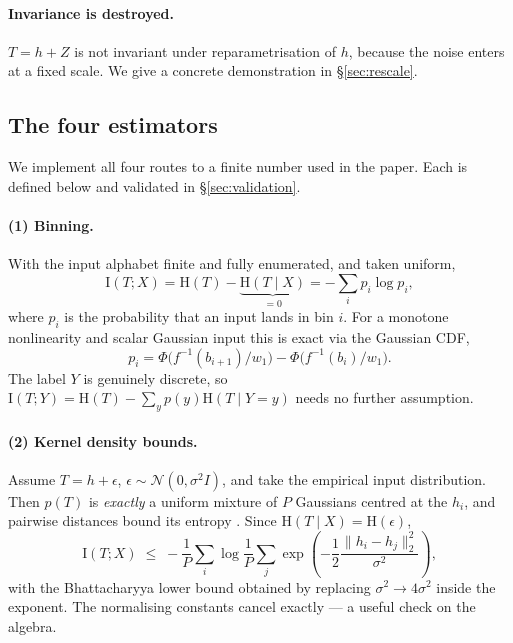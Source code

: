 \documentclass[11pt,a4paper]{article}
\newcommand{\I}{\mathrm{I}}
\newcommand{\HH}{\mathrm{H}}
\newcommand{\Norm}{\mathcal{N}}
\begin{document}
\paragraph{Invariance is destroyed.} $T = h+Z$ is not invariant under
reparametrisation of $h$, because the noise enters at a fixed scale. We give a
concrete demonstration in \S\ref{sec:rescale}.

\subsection{The four estimators}
\label{sec:estimators}

We implement all four routes to a finite number used in the paper. Each is
defined below and validated in \S\ref{sec:validation}.

\paragraph{(1) Binning.} With the input alphabet finite and fully enumerated, and
taken uniform,
\begin{equation}
  \I(T;X) = \HH(T) - \underbrace{\HH(T \mid X)}_{=0} = -\sum_i p_i \log p_i,
  \label{eq:binning}
\end{equation}
where $p_i$ is the probability that an input lands in bin $i$. For a monotone
nonlinearity and scalar Gaussian input this is exact via the Gaussian CDF,
\begin{equation}
  p_i = \Phi\!\big(f^{-1}(b_{i+1})/w_1\big) - \Phi\!\big(f^{-1}(b_{i})/w_1\big).
  \label{eq:bincdf}
\end{equation}
The label $Y$ is genuinely discrete, so
$\I(T;Y)=\HH(T)-\sum_y p(y)\HH(T\mid Y{=}y)$ needs no further assumption.

\paragraph{(2) Kernel density bounds.} Assume $T=h+\epsilon$,
$\epsilon\sim\Norm(0,\sigma^2 I)$, and take the empirical input distribution.
Then $p(T)$ is \emph{exactly} a uniform mixture of $P$ Gaussians centred at the
$h_i$, and pairwise distances bound its entropy
\citep{kolchinsky2017estimating}. Since $\HH(T\mid X)=\HH(\epsilon)$,
\begin{equation}
  \I(T;X) \;\le\; -\frac{1}{P}\sum_i \log \frac{1}{P}\sum_j
    \exp\!\left(-\frac{1}{2}\frac{\lVert h_i-h_j\rVert_2^2}{\sigma^2}\right),
  \label{eq:kdeupper}
\end{equation}
with the Bhattacharyya lower bound obtained by replacing $\sigma^2 \to 4\sigma^2$
inside the exponent. The normalising constants cancel exactly --- a useful check
on the algebra.
\end{document}
